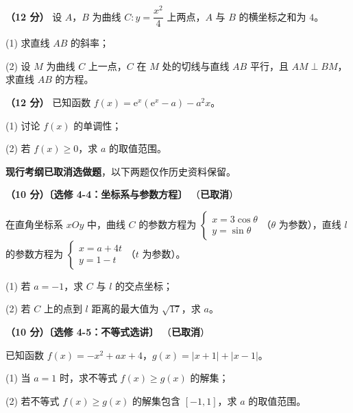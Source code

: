 \begin{question}
\textbf{（12 分）} 设 $A$，$B$ 为曲线 $C:y=\dfrac{x^{2}}4$ 上两点，$A$ 与 $B$ 的横坐标之和为 $4$。

  (1) 求直线 $AB$ 的斜率；

  (2) 设 $M$ 为曲线 $C$ 上一点，$C$ 在 $M$ 处的切线与直线 $AB$ 平行，且 $AM\perp BM$，求直线 $AB$ 的方程。

\end{question}
\begin{question}
\textbf{（12 分）} 已知函数 $f(x)=\mathrm e^{x}\left(\mathrm e^{x}-a\right)-a^{2}x$。

  (1) 讨论 $f(x)$ 的单调性；

  (2) 若 $f(x)\ge0$，求 $a$ 的取值范围。

\par\medskip

\end{question}

\begin{gktip}
\textbf{ 现行考纲已取消选做题}，以下两题仅作历史资料保留。
\end{gktip}

\begin{question}
\textbf{（10 分）〔选修 4-4：坐标系与参数方程〕} （\textbf{已取消}）

在直角坐标系 $xOy$ 中，曲线 $C$ 的参数方程为 $\begin{cases}x=3\cos\theta\\ y=\sin\theta\end{cases}$（$\theta$ 为参数），直线 $l$ 的参数方程为 $\begin{cases}x=a+4t\\ y=1-t\end{cases}$（$t$ 为参数）。

  (1) 若 $a=-1$，求 $C$ 与 $l$ 的交点坐标；

  (2) 若 $C$ 上的点到 $l$ 距离的最大值为 $\sqrt{17}$，求 $a$。

\end{question}
\begin{question}
\textbf{（10 分）〔选修 4-5：不等式选讲〕} （\textbf{已取消}）

已知函数 $f(x)=-x^{2}+ax+4$，$g(x)=|x+1|+|x-1|$。

  (1) 当 $a=1$ 时，求不等式 $f(x)\ge g(x)$ 的解集；

  (2) 若不等式 $f(x)\ge g(x)$ 的解集包含 $[-1,1]$，求 $a$ 的取值范围。

\par\medskip


\end{question}